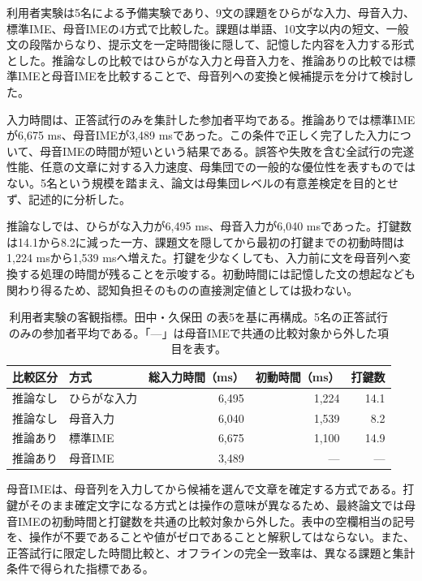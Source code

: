 利用者実験は5名による予備実験であり、9文の課題をひらがな入力、母音入力、標準IME、母音IMEの4方式で比較した。課題は単語、10文字以内の短文、一般文の段階からなり、提示文を一定時間後に隠して、記憶した内容を入力する形式とした。推論なしの比較ではひらがな入力と母音入力を、推論ありの比較では標準IMEと母音IMEを比較することで、母音列への変換と候補提示を分けて検討した。

入力時間は、正答試行のみを集計した参加者平均である。推論ありでは標準IMEが6,675 ms、母音IMEが3,489 msであった。この条件で正しく完了した入力について、母音IMEの時間が短いという結果である。誤答や失敗を含む全試行の完遂性能、任意の文章に対する入力速度、母集団での一般的な優位性を表すものではない。5名という規模を踏まえ、論文は母集団レベルの有意差検定を目的とせず、記述的に分析した。

推論なしでは、ひらがな入力が6,495 ms、母音入力が6,040 msであった。打鍵数は14.1から8.2に減った一方、課題文を隠してから最初の打鍵までの初動時間は1,224 msから1,539 msへ増えた。打鍵を少なくしても、入力前に文を母音列へ変換する処理の時間が残ることを示唆する。初動時間には記憶した文の想起なども関わり得るため、認知負担そのものの直接測定値としては扱わない。

\begin{table}[tbp]
  \centering
  \caption{利用者実験の客観指標。田中・久保田 \autocite{tanaka2026fss}の表5を基に再構成。5名の正答試行のみの参加者平均である。「—」は母音IMEで共通の比較対象から外した項目を表す。}
  \label{tab:fss-user-study}
  \begin{tabular}{llrrr}
    \hline
    比較区分 & 方式 & 総入力時間（ms） & 初動時間（ms） & 打鍵数 \\
    \hline
    推論なし & ひらがな入力 & 6,495 & 1,224 & 14.1 \\
    推論なし & 母音入力 & 6,040 & 1,539 & 8.2 \\
    推論あり & 標準IME & 6,675 & 1,100 & 14.9 \\
    推論あり & 母音IME & 3,489 & — & — \\
    \hline
  \end{tabular}
\end{table}

母音IMEは、母音列を入力してから候補を選んで文章を確定する方式である。打鍵がそのまま確定文字になる方式とは操作の意味が異なるため、最終論文では母音IMEの初動時間と打鍵数を共通の比較対象から外した。表中の空欄相当の記号を、操作が不要であることや値がゼロであることと解釈してはならない。また、正答試行に限定した時間比較と、オフラインの完全一致率は、異なる課題と集計条件で得られた指標である。

